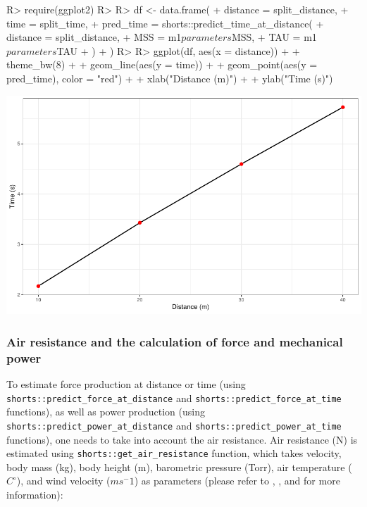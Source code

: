 \documentclass[
]{jss}
\begin{document}
\begin{CodeChunk}
\begin{CodeInput}
R> require(ggplot2)
R> 
R> df <- data.frame(
+   distance = split_distance,
+   time = split_time,
+   pred_time = shorts::predict_time_at_distance(
+     distance = split_distance,
+     MSS = m1$parameters$MSS,
+     TAU = m1$parameters$TAU
+   )
+ )
R> 
R> ggplot(df, aes(x = distance)) +
+   theme_bw(8) +
+   geom_line(aes(y = time)) +
+   geom_point(aes(y = pred_time), color = "red") +
+   xlab("Distance (m)") +
+   ylab("Time (s)")
\end{CodeInput}


\begin{center}\includegraphics[width=1\linewidth]{paper_files/figure-latex/unnamed-chunk-4-1} \end{center}

\end{CodeChunk}

\hypertarget{air-resistance-and-the-calculation-of-force-and-mechanical-power}{%
\subsubsection{Air resistance and the calculation of force and mechanical power}\label{air-resistance-and-the-calculation-of-force-and-mechanical-power}}

To estimate force production at distance or time (using \texttt{shorts::predict\_force\_at\_distance} and \texttt{shorts::predict\_force\_at\_time} functions), as well as power production (using \texttt{shorts::predict\_power\_at\_distance} and \texttt{shorts::predict\_power\_at\_time} functions), one needs to take into account the air resistance. Air resistance (N) is estimated using \texttt{shorts::get\_air\_resistance} function, which takes velocity, body mass (kg), body height (m), barometric pressure (Torr), air temperature (\(C^\circ\)), and wind velocity (\(ms^-1\)) as parameters (please refer to \citet{arsacModelingEnergetics100m2002}, \citet{samozinoSimpleMethodMeasuring2016}, and \citet{vaningenschenauCanCyclePower1991} for more information):
\end{document}
